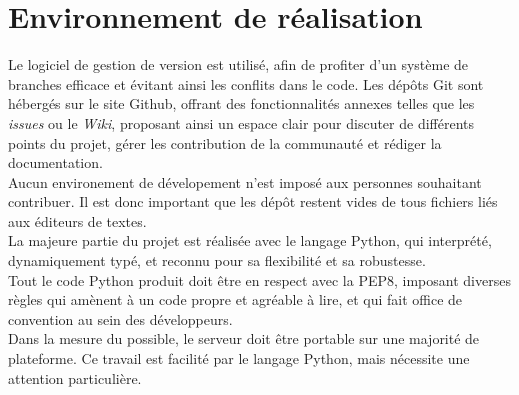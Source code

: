 \section{Environnement de réalisation}
Le logiciel de gestion de version est utilisé, afin de profiter d'un système de branches efficace et évitant ainsi les conflits dans le code.
Les dépôts Git sont hébergés sur le site Github, offrant des fonctionnalités annexes telles que les \textit{issues} ou le \textit{Wiki}, proposant ainsi un espace clair pour discuter de différents points du projet, gérer les contribution de la communauté et rédiger la documentation.\\

Aucun environement de dévelopement n'est imposé aux personnes souhaitant contribuer. Il est donc important que les dépôt restent vides de tous fichiers liés aux éditeurs de textes.\\

La majeure partie du projet est réalisée avec le langage Python, qui interprété, dynamiquement typé, et reconnu pour sa flexibilité et sa robustesse.\\
Tout le code Python produit doit être en respect avec la PEP8, imposant diverses règles qui amènent à un code propre et agréable à lire, et qui fait office de convention au sein des développeurs.\\

Dans la mesure du possible, le serveur doit être portable sur une majorité de plateforme. Ce travail est facilité par le langage Python, mais nécessite une attention particulière.

